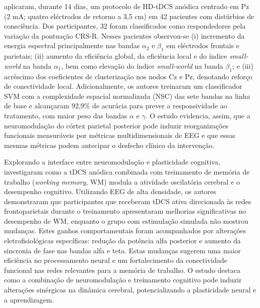  aplicaram, durante 14 dias, um protocolo de HD-tDCS anódica centrado em Pz (2 mA; quatro eléctrodos de retorno a 3,5 cm) em 42 pacientes com distúrbios de consciência. Dos participantes, 32 foram classificados como respondedores pela variação da pontuação CRS-R. Nesses pacientes observou-se (i) incremento da energia espectral principalmente nas bandas $\alpha_2$ e $\beta_1$ em eléctrodos frontais e parietais; (ii) aumento da eficiência global, da eficiência local e do índice \textit{small-world} na banda $\alpha_1$, bem como elevação do índice \textit{small-world} na banda $\beta_1$; e (iii) acréscimo dos coeficientes de clusterização nos nodos Cz e Pz, denotando reforço de conectividade local. Adicionalmente, os autores treinaram um classificador SVM com a complexidade espacial normalizada (NSC) das sete bandas na linha de base e alcançaram 92,9\% de acurácia para prever a responsividade ao tratamento, com maior peso das bandas $\alpha$ e $\gamma$. O estudo evidencia, assim, que a neuromodulação do córtex parietal posterior pode induzir reorganizações funcionais mensuráveis por métricas multidimensionais de EEG e que essas mesmas métricas podem antecipar o desfecho clínico da intervenção.

Explorando a interface entre neuromodulação e plasticidade cognitiva,  investigaram como a tDCS anódica combinada com treinamento de memória de trabalho (\textit{working memory}, WM) modula a atividade oscilatória cerebral e o desempenho cognitivo. Utilizando EEG de alta densidade, os autores demonstraram que participantes que receberam tDCS ativa direcionada às redes frontoparietais durante o treinamento apresentaram melhorias significativas no desempenho de WM, enquanto o grupo com estimulação simulada não mostrou mudanças. Estes ganhos comportamentais foram acompanhados por alterações eletrofisiológicas específicas: redução da potência alfa posterior e aumento da sincronia de fase nas bandas alfa e teta. Estas mudanças sugerem uma maior eficiência no processamento neural e um fortalecimento da conectividade funcional nas redes relevantes para a memória de trabalho. O estudo destaca como a combinação de neuromodulação e treinamento cognitivo pode induzir alterações sinérgicas na dinâmica cerebral, potencializando a plasticidade neural e a aprendizagem.

